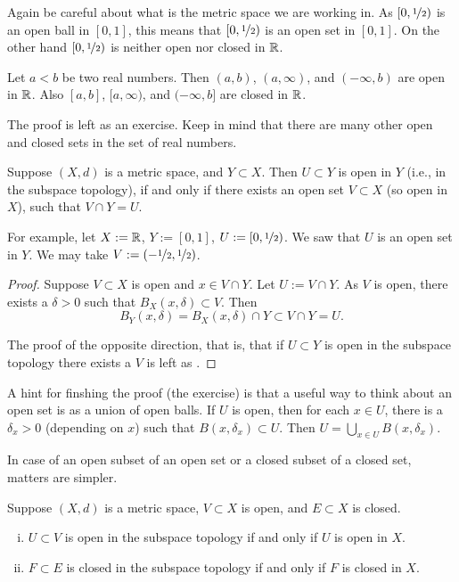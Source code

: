 Again be careful about what is the metric space we are working in.
As $[0,\nicefrac{1}{2})$ is
an open ball in $[0,1]$, this means that $[0,\nicefrac{1}{2})$ is
an open set in $[0,1]$.  On the other hand $[0,\nicefrac{1}{2})$
is neither open nor closed in ${\mathbb{R}}$.

\begin{prop} \label{prop:topology:intervals:openclosed}
Let $a < b$ be two real numbers.  Then $(a,b)$, $(a,\infty)$,
and $(-\infty,b)$ are open in ${\mathbb{R}}$.
Also $[a,b]$, $[a,\infty)$,
and $(-\infty,b]$ are closed in ${\mathbb{R}}$.
\end{prop}

The proof is left as an exercise.  Keep in mind that
there are many other open and
closed sets in the set of real numbers. %

\begin{prop} \label{prop:topology:subspaceopen}
Suppose $(X,d)$ is a metric space, and $Y \subset X$.  Then $U \subset Y$
is open in $Y$ (i.e., in the subspace topology), if and only if
there exists an open set $V \subset X$ (so open in $X$), such that
$V \cap Y = U$.
\end{prop}

For example, let $X := {\mathbb{R}}$, $Y:=[0,1]$, $U := [0,\nicefrac{1}{2})$.
We saw that $U$ is an open set in $Y$.
We may take $V := (-\nicefrac{1}{2},\nicefrac{1}{2})$.

\begin{proof}
Suppose $V \subset X$ is open and $x \in V \cap Y$.
Let $U := V \cap Y$.
As $V$ is open, there
exists a $\delta > 0$ such that $B_X(x,\delta) \subset V$.
Then
\begin{equation*}
B_Y(x,\delta) = B_X(x,\delta) \cap Y \subset V \cap Y = U .
\end{equation*}

The proof of the opposite direction, that is, that if $U \subset Y$
is open in the subspace topology there exists a $V$ is left as
.
\end{proof}

A hint for finshing the proof (the exercise) is that
a useful way to think about an open set is as a union of open balls.  If $U$ is
open, then for each $x \in U$, there is a $\delta_x > 0$ (depending on $x$) such that
$B(x,\delta_x) \subset U$.  Then $U = \bigcup_{x\in U} B(x,\delta_x)$.

In case of an open subset of an open set or a closed subset of a closed
set, matters are simpler.

\begin{prop} \label{prop:topology:subspacesame}
Suppose $(X,d)$ is a metric space, $V \subset X$ is open,
and $E \subset X$ is closed.
\begin{enumerate}[(i)]
\item \label{prop:topology:subspacesame:i}
$U \subset V$ is open in the subspace topology if and only if $U$ is open
in $X$.
\item \label{prop:topology:subspacesame:ii}
$F \subset E$ is closed in the subspace topology if and only if $F$ is
closed in $X$.
\end{enumerate}
\end{prop}

